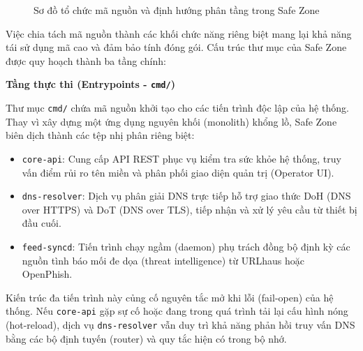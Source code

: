 \begin{figure}[H]
    \caption{Sơ đồ tổ chức mã nguồn và định hướng phân tầng trong Safe Zone}
    \label{fig:source_code_structure}
\end{figure}

Việc chia tách mã nguồn thành các khối chức năng riêng biệt mang lại khả năng tái sử dụng mã cao và đảm bảo tính đóng gói. Cấu trúc thư mục của Safe Zone được quy hoạch thành ba tầng chính:

\textbf{Tầng thực thi (Entrypoints - \texttt{cmd/})}

Thư mục \texttt{cmd/} chứa mã nguồn khởi tạo cho các tiến trình độc lập của hệ thống. Thay vì xây dựng một ứng dụng nguyên khối (monolith) khổng lồ, Safe Zone biên dịch thành các tệp nhị phân riêng biệt:
\begin{itemize}
    \item \texttt{core-api}: Cung cấp API REST phục vụ kiểm tra sức khỏe hệ thống, truy vấn điểm rủi ro tên miền và phân phối giao diện quản trị (Operator UI).
    \item \texttt{dns-resolver}: Dịch vụ phân giải DNS trực tiếp hỗ trợ giao thức DoH (DNS over HTTPS) và DoT (DNS over TLS), tiếp nhận và xử lý yêu cầu từ thiết bị đầu cuối.
    \item \texttt{feed-syncd}: Tiến trình chạy ngầm (daemon) phụ trách đồng bộ định kỳ các nguồn tình báo mối đe dọa (threat intelligence) từ URLhaus hoặc OpenPhish.
\end{itemize}
Kiến trúc đa tiến trình này củng cố nguyên tắc mở khi lỗi (fail-open) của hệ thống. Nếu \texttt{core-api} gặp sự cố hoặc đang trong quá trình tải lại cấu hình nóng (hot-reload), dịch vụ \texttt{dns-resolver} vẫn duy trì khả năng phản hồi truy vấn DNS bằng các bộ định tuyến (router) và quy tắc hiện có trong bộ nhớ.

